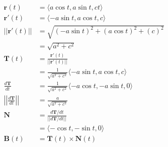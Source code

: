 \documentclass{article}
\begin{document}
\setcounter{subsubsection}{2}
\subsubsection{}

\begin{align*}
  \mathbf{r}(t)                                      & = \langle a \cos t, a \sin t, c t \rangle                                                                                      \\
  \mathbf{r}'(t)                                     & = \langle -a \sin t, a \cos t, c \rangle                                                                                       \\
  ||\mathbf{r}'(t)||                                 & = \sqrt{(-a \sin t)^2 + (a \cos t)^2 + (c)^2}                                                                                  \\
                                                     & = \sqrt{a^2 + c^2}                                                                                                             \\
  \mathbf{T}(t)                                      & = \frac{\mathbf{r}'(t)}{||\mathbf{r}'(t)||}                                                                                    \\
                                                     & = \frac{1}{\sqrt{a^2 + c^2}} \langle -a \sin t, a \cos t, c \rangle                                                            \\
  \frac{d \mathbf{T}}{d t}                           & = \frac{1}{\sqrt{a^2 + c^2}} \langle -a \cos t, -a \sin t, 0 \rangle                                                           \\
  \left|\left|\frac{d \mathbf{T}}{d t}\right|\right| & = \frac{a}{\sqrt{a^2 + c^2}}                                                                                                   \\
  \mathbf{N}                                         & = \frac{d \mathbf{T} / d t}{||d \mathbf{T} / d t||}                                                                            \\
                                                     & = \langle -\cos t, -\sin t, 0 \rangle                                                                                          \\
  \mathbf{B}(t)                                      & = \mathbf{T}(t) \times \mathbf{N}(t)                                                                                           \\

\end{align*}
\end{document}
